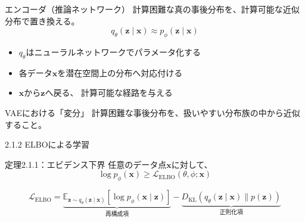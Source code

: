 \begin{frame}{エンコーダ（推論ネットワーク）}
    計算困難な真の事後分布を、計算可能な近似分布で置き換える。
    \[
        \boxed{
        q_\theta(\boldsymbol{z}\mid\boldsymbol{x})
        \approx
        p_\phi(\boldsymbol{z}\mid\boldsymbol{x})
        }
    \]
    \begin{itemize}
        \item $q_\theta$はニューラルネットワークでパラメータ化する
        \item 各データ$\boldsymbol{x}$を潜在空間上の分布へ対応付ける
        \item $\boldsymbol{x}$から$\boldsymbol{z}$へ戻る、
        計算可能な経路を与える
    \end{itemize}
    \begin{exampleblock}{VAEにおける「変分」}
        計算困難な事後分布を、扱いやすい分布族の中から近似すること。
    \end{exampleblock}
\end{frame}
\begin{frame}{2.1.2 ELBOによる学習}
    \begin{block}{定理2.1.1：エビデンス下界}
        任意のデータ点$\boldsymbol{x}$に対して、
        \[
            \log p_\phi(\boldsymbol{x})
            \geq
            \mathcal{L}_{\mathrm{ELBO}}(\theta,\phi;\boldsymbol{x})
        \]
    \end{block}
    \small
    \[
        \boxed{
        \mathcal{L}_{\mathrm{ELBO}}
        =
        \underbrace{
        \mathbb{E}_{\boldsymbol{z}\sim q_\theta(\boldsymbol{z}\mid\boldsymbol{x})}
        [\log p_\phi(\boldsymbol{x}\mid\boldsymbol{z})]
        }_{\text{再構成項}}
        -
        \underbrace{
        D_{\mathrm{KL}}\!\left(
        q_\theta(\boldsymbol{z}\mid\boldsymbol{x})
        \|p(\boldsymbol{z})
        \right)
        }_{\text{正則化項}}
        }
    \]
\end{frame}
